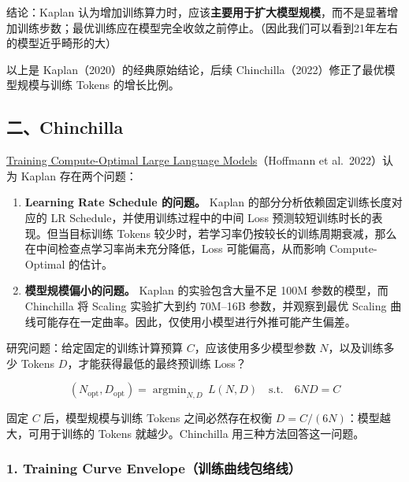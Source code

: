 \documentclass[
  11pt,
  a4paper,
  fontset=none]{ctexart}
\providecommand{\tightlist}{%
  \setlength{\itemsep}{0pt}\setlength{\parskip}{0pt}}
\newenvironment{NotesFormula}{%
  \par\noindent\begin{minipage}{\linewidth}%
  \setlength{\parindent}{2em}%
  \setlength{\parskip}{0.35em}%
}{\end{minipage}\par}
\begin{document}
结论：Kaplan
认为增加训练算力时，应该\textbf{主要用于扩大模型规模}，而不是显著增加训练步数；最优训练应在模型完全收敛之前停止。（因此我们可以看到21年左右的模型近乎畸形的大）

以上是 Kaplan（2020）的经典原始结论，后续
Chinchilla（2022）修正了最优模型规模与训练 Tokens 的增长比例。

\clearpage

\subsection{二、Chinchilla}\label{ux4e8cchinchilla}

\href{https://arxiv.org/abs/2203.15556}{Training Compute-Optimal Large
Language Models}（Hoffmann et al.~2022）认为 Kaplan 存在两个问题：

\begin{enumerate}
\def\labelenumi{\arabic{enumi}.}
\tightlist
\item
  \textbf{Learning Rate Schedule 的问题。} Kaplan
  的部分分析依赖固定训练长度对应的 LR Schedule，并使用训练过程中的中间
  Loss 预测较短训练时长的表现。但当目标训练 Tokens
  较少时，若学习率仍按较长的训练周期衰减，那么在中间检查点学习率尚未充分降低，Loss
  可能偏高，从而影响 Compute-Optimal 的估计。
\item
  \textbf{模型规模偏小的问题。} Kaplan 的实验包含大量不足 100M
  参数的模型，而 Chinchilla 将 Scaling 实验扩大到约 70M--16B
  参数，并观察到最优 Scaling
  曲线可能存在一定曲率。因此，仅使用小模型进行外推可能产生偏差。
\end{enumerate}

\begin{NotesFormula}

研究问题：给定固定的训练计算预算 \(C\)，应该使用多少模型参数
\(N\)，以及训练多少 Tokens \(D\)，才能获得最低的最终预训练 Loss？

\[\boxed{(N_{\mathrm{opt}},D_{\mathrm{opt}})=\mathop{\mathrm{argmin}}_{N,D}\,L(N,D)\quad\text{s.t.}\quad 6ND=C}\]

\end{NotesFormula}

固定 \(C\) 后，模型规模与训练 Tokens 之间必然存在权衡
\(D=C/(6N)\)：模型越大，可用于训练的 Tokens 就越少。Chinchilla
用三种方法回答这一问题。

\subsubsection{1. Training Curve
Envelope（训练曲线包络线）}\label{training-curve-envelopeux8badux7ec3ux66f2ux7ebfux5305ux7edcux7ebf}
\end{document}
